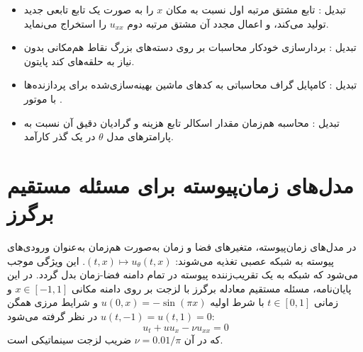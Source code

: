 \begin{itemize}
\item تبدیل : تابع  مشتق مرتبه اول نسبت به مکان $x$ را به صورت یک تابع تابعی جدید تولید می‌کند، و اعمال مجدد آن مشتق مرتبه دوم $u_{xx}$ را استخراج می‌نماید.
\item تبدیل : بردارسازی خودکار محاسبات بر روی دسته‌های بزرگ نقاط هم‌مکانی بدون نیاز به حلقه‌های کند پایتون.
\item تبدیل : کامپایل گراف محاسباتی به کدهای ماشین بهینه‌سازی‌شده برای پردازنده‌ها با موتور .
\item تبدیل : محاسبه هم‌زمان مقدار اسکالر تابع هزینه و گرادیان دقیق آن نسبت به پارامترهای مدل $\theta$ در یک گذر کارآمد.
\end{itemize}

\section{مدل‌های زمان‌پیوسته برای مسئله مستقیم برگرز}
\label{sec:continuous}

در مدل‌های زمان‌پیوسته، متغیرهای فضا و زمان به‌صورت هم‌زمان به‌عنوان ورودی‌های پیوسته به شبکه عصبی تغذیه می‌شوند: $(t,x) \mapsto u_\theta(t,x)$. این ویژگی موجب می‌شود که شبکه به یک تقریب‌زننده پیوسته در تمام دامنه فضا-زمان بدل گردد. در این پایان‌نامه، مسئله مستقیم معادله برگرز با لزجت بر روی دامنه مکانی $x \in [-1, 1]$ و زمانی $t \in [0, 1]$ با شرط اولیه $u(0,x) = -\sin(\pi x)$ و شرایط مرزی همگن $u(t,-1) = u(t,1) = 0$ در نظر گرفته می‌شود:
\begin{equation}
u_t + u u_x - \nu u_{xx} = 0
\label{eq:burgers-fwd-pde}
\end{equation}
که در آن $\nu = 0.01/\pi$ ضریب لزجت سینماتیکی است.

